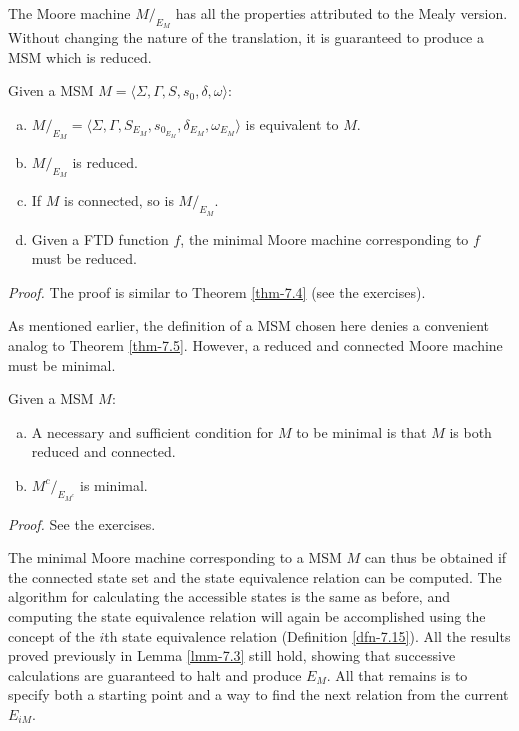 The Moore machine $M/  _{E_M}$ has all the properties attributed to the Mealy
version. Without changing the nature of the translation, it is guaranteed to
produce a MSM which is reduced.

\begin{thm}\label{thm-7.9}
Given a MSM $M=\langle\Sigma,\Gamma,S,s_0,\delta,\omega\rangle$:
\begin{enumerate}[a.]
\item $M/  _{E_M}=\langle\Sigma,\Gamma,S_{E_M},s_{0_{E_M}},\delta_{E_M},
	\omega_{E_M}\rangle$ is equivalent to $M$.
\item $M/  _{E_M}$ is reduced.
\item If $M$ is connected, so is $M/  _{E_M}$.
\item Given a FTD function $f$, the minimal Moore machine corresponding to $f$
must be reduced.
\end{enumerate}

\emph{Proof.} The proof is similar to Theorem \ref{thm-7.4} (see the exercises).
\end{thm}

As mentioned earlier, the definition of a MSM chosen here denies a convenient
analog to Theorem \ref{thm-7.5}. However, a reduced and connected Moore machine must be
minimal.

\begin{thm}\label{thm-7.10}
Given a MSM $M$:
\begin{enumerate}[(a)]
\item
A necessary and sufficient condition for $M$ to be
	minimal is that $M$ is both reduced and connected.
\item $M^c /  _{E_{M^c}}$ is minimal.
\end{enumerate}

\emph{Proof.} See the exercises.
\end{thm}

The minimal Moore machine corresponding to a MSM $M$ can thus be obtained
if the connected state set and the state equivalence relation can be computed.
The algorithm for calculating the accessible states is the same as before, and
computing the state equivalence relation will again be accomplished using the
concept of the $i$th state equivalence relation (Definition \ref{dfn-7.15}). All the
results proved previously in Lemma \ref{lmm-7.3} still hold, showing that successive
calculations are guaranteed to halt and produce $E_M$. All that remains is to
specify both a starting point and a way to find the next relation from the
current $E_{iM}$.

